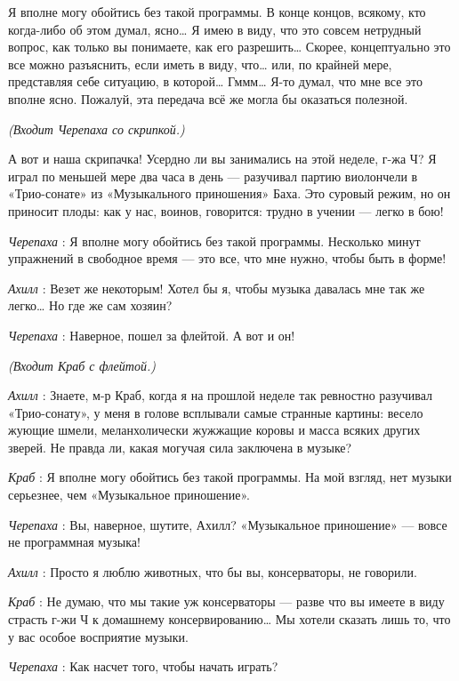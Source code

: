 \documentclass[../main.tex]{subfiles}
\begin{document}
\begin{dialogue}

 Я вполне могу обойтись без такой программы. В конце концов, всякому, кто когда-либо об этом думал, ясно\ldots{} Я имею в виду, что это совсем нетрудный вопрос, как только вы понимаете, как его разрешить\ldots{} Скорее, концептуально это все можно разъяснить, если иметь в виду, что\ldots{} или, по крайней мере, представляя себе ситуацию, в которой\ldots{} Гммм\ldots{} Я-то думал, что мне все это вполне ясно. Пожалуй, эта передача всё же могла бы оказаться полезной.

\emph{(Входит Черепаха со скрипкой.)}

А вот и наша скрипачка! Усердно ли вы занимались на этой неделе, г-жа Ч? Я играл по меньшей мере два часа в день --- разучивал партию виолончели в «Трио-сонате» из «Музыкального приношения» Баха. Это суровый режим, но он приносит плоды: как у нас, воинов, говорится: трудно в учении --- легко в бою!

\emph{Черепаха} : Я вполне могу обойтись без такой программы. Несколько минут упражнений в свободное время --- это все, что мне нужно, чтобы быть в форме!

\emph{Ахилл} : Везет же некоторым! Хотел бы я, чтобы музыка давалась мне так же легко\ldots{} Но где же сам хозяин?

\emph{Черепаха} : Наверное, пошел за флейтой. А вот и он!

\emph{(Входит Краб с флейтой.)}

\emph{Ахилл} : Знаете, м-р Краб, когда я на прошлой неделе так ревностно разучивал «Трио-сонату», у меня в голове всплывали самые странные картины: весело жующие шмели, меланхолически жужжащие коровы и масса всяких других зверей. Не правда ли, какая могучая сила заключена в музыке?

\emph{Краб} : Я вполне могу обойтись без такой программы. На мой взгляд, нет музыки серьезнее, чем «Музыкальное приношение».

\emph{Черепаха} : Вы, наверное, шутите, Ахилл? «Музыкальное приношение» --- вовсе не программная музыка!

\emph{Ахилл} : Просто я люблю животных, что бы вы, консерваторы, не говорили.

\emph{Краб} : Не думаю, что мы такие уж консерваторы --- разве что вы имеете в виду страсть г-жи Ч к домашнему консервированию\ldots{} Мы хотели сказать лишь то, что у вас особое восприятие музыки.

\emph{Черепаха} : Как насчет того, чтобы начать играть?


\end{dialogue}
\end{document}

